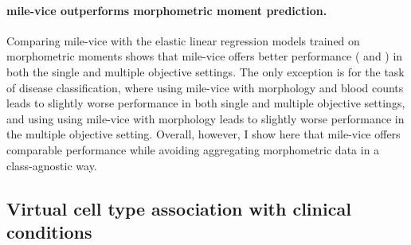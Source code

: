 \begin{figure}[!ht]
    \label{fig:mile-vice-roc-curves}
\end{figure}

\paragraph{\Ac{mile-vice} outperforms morphometric moment prediction.} Comparing \ac{mile-vice} with the elastic linear regression models trained on morphometric moments shows that \ac{mile-vice} offers better performance ( and ) in both the single and multiple objective settings. The only exception is for the task of disease classification, where using \ac{mile-vice} with morphology and blood counts leads to slightly worse performance in both single and multiple objective settings, and using using \ac{mile-vice} with morphology leads to slightly worse performance in the multiple objective setting. Overall, however, I show here that \ac{mile-vice} offers comparable performance while avoiding aggregating morphometric data in a class-agnostic way. 

\begin{figure}[!ht]
    \label{fig:mile-vice-vs-glmnet}
\end{figure}

\begin{figure}[!ht]
    \label{fig:mile-vice-vs-glmnet-scatter}
\end{figure}

\subsection{Virtual cell type association with clinical conditions}


